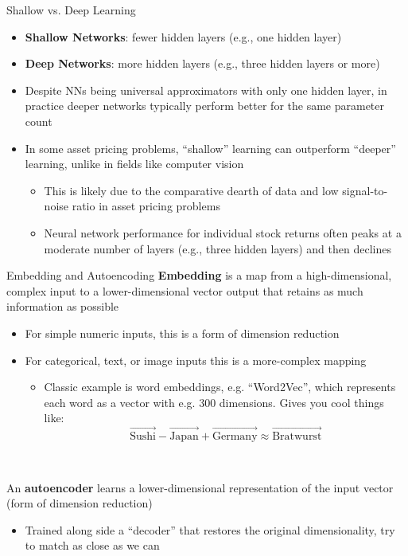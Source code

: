 \documentclass[xcolor=table, aspectratio=169]{beamer}
\newcommand{\alertbf}[1]{\alert{\textbf{#1}}}
\begin{document}
\begin{frame}{Shallow vs. Deep Learning}
    \begin{itemize}
        \item \alertbf{Shallow Networks}: fewer hidden layers (e.g., one hidden layer)
        \item \alertbf{Deep Networks}: more hidden layers (e.g., three hidden layers or more)
        \item Despite NNs being universal approximators with only one hidden layer, in practice deeper networks typically perform better for the same parameter count
        \item In some asset pricing problems, ``shallow'' learning can outperform ``deeper'' learning, unlike in fields like computer vision
        \begin{itemize}
            \item This is likely due to the comparative dearth of data and low signal-to-noise ratio in asset pricing problems
            \item Neural network performance for individual stock returns often peaks at a moderate number of layers (e.g., three hidden layers) and then declines 
        \end{itemize}
    \end{itemize}
\end{frame}

\begin{frame}{Embedding and Autoencoding}
\alertbf{Embedding} is a map from a high-dimensional, complex input to a lower-dimensional vector output that retains as much information as possible
\begin{itemize}
    \item For simple numeric inputs, this is a form of dimension reduction
    \item For categorical, text, or image inputs this is a more-complex mapping
    \begin{itemize}
        \item Classic example is word embeddings, e.g. ``Word2Vec'', which represents each word as a vector with e.g. 300 dimensions. Gives you cool things like:
        $$\overrightarrow{\text{Sushi}} - \overrightarrow{\text{Japan}} + \overrightarrow{\text{Germany}} \approx \overrightarrow{\text{Bratwurst}} $$
    \end{itemize}
\end{itemize}

~

An \alertbf{autoencoder} learns a lower-dimensional representation of the input vector (form of dimension reduction)
\begin{itemize}
    \item Trained along side a ``decoder'' that restores the original dimensionality, try to match as close as we can
\end{itemize}
\end{frame}
\end{document}
